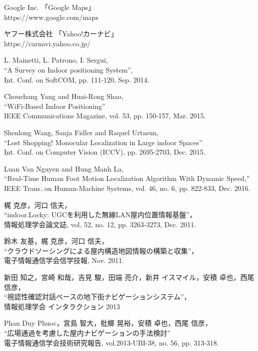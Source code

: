 \begin{thebibliography}{99}

Google Inc. 「Google Maps」\\
https://www.google.com/maps

ヤフー株式会社 「Yahoo!カーナビ」\\
https://carnavi.yahoo.co.jp/

L. Mainetti, L. Patrono, I. Sergui,\\
``A Survey on Indoor positioning System'',\\
Int. Conf. on SoftCOM, pp. 111-120, Sep. 2014.

Chouchang Yang and Huai-Rong Shao,\\
``WiFi-Based Indoor Positioning''\\
IEEE Communications Magazine, vol. 53, pp. 150-157, Mar. 2015.

Shenlong Wang, Sanja Fidler and Raquel Urtasun,\\
``Lost Shopping! Monocular Localization in Large indoor Spaces''\\
Int. Conf. on Computer Vision (ICCV), pp. 2695-2703, Dec. 2015.

Luan Van Nguyen and Hung Manh La,\\
``Real-Time Human Foot Motion Localization Algorithm With Dynamic Speed,'' \\
IEEE Trans. on Human-Machine Systems, vol. 46, no. 6, pp. 822-833, Dec. 2016.

梶 克彦，河口 信夫， \\
``indoor.Locky: UGCを利用した無線LAN屋内位置情報基盤''， \\
情報処理学会論文誌, vol. 52, no. 12, pp. 3263-3273, Dec. 2011.

鈴木 友基，梶 克彦，河口 信夫， \\
``クラウドソーシングによる屋内構造地図情報の構築と収集''，\\
電子情報通信学会信学技報, Nov. 2011.

新田 知之，宮崎 和哉，吉見 駿，田端 亮介，新井 イスマイル，安積 卓也，西尾 信彦，\\
“視認性確認対話ベースの地下街ナビゲーションシステム”，\\
情報処理学会 インタラクション 2013

Phan Duy Phuoc，宮島 智大，枇榔 晃裕，安積 卓也，西尾 信彦，\\
``広場通過を考慮した屋内ナビゲーションの手法検討''\\
電子情報通信学会技術研究報告, vol.2013-UBI-38, no. 56, pp. 313-318.


\end{thebibliography}
